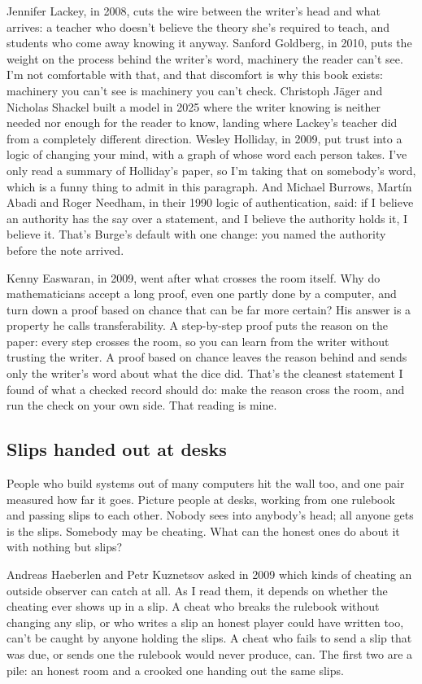 \documentclass[11pt,twoside]{article}
\theoremstyle{thielethm}
\theoremstyle{thieledef}
\theoremstyle{thieledef}
\theoremstyle{thieledef}
\theoremstyle{thielethm}
\theoremstyle{thieleobs}
\theoremstyle{thielethm}
\begin{document}
Jennifer Lackey, in 2008, cuts the wire between the writer's head and what arrives: a teacher who doesn't believe the theory she's required to teach, and students who come away knowing it anyway. Sanford Goldberg, in 2010, puts the weight on the process behind the writer's word, machinery the reader can't see. I'm not comfortable with that, and that discomfort is why this book exists: machinery you can't see is machinery you can't check. Christoph Jäger and Nicholas Shackel built a model in 2025 where the writer knowing is neither needed nor enough for the reader to know, landing where Lackey's teacher did from a completely different direction. Wesley Holliday, in 2009, put trust into a logic of changing your mind, with a graph of whose word each person takes. I've only read a summary of Holliday's paper, so I'm taking that on somebody's word, which is a funny thing to admit in this paragraph. And Michael Burrows, Martín Abadi and Roger Needham, in their 1990 logic of authentication, said: if I believe an authority has the say over a statement, and I believe the authority holds it, I believe it. That's Burge's default with one change: you named the authority before the note arrived.

Kenny Easwaran, in 2009, went after what crosses the room itself. Why do mathematicians accept a long proof, even one partly done by a computer, and turn down a proof based on chance that can be far more certain? His answer is a property he calls transferability. A step-by-step proof puts the reason on the paper: every step crosses the room, so you can learn from the writer without trusting the writer. A proof based on chance leaves the reason behind and sends only the writer's word about what the dice did. That's the cleanest statement I found of what a checked record should do: make the reason cross the room, and run the check on your own side. That reading is mine.

\subsection{Slips handed out at desks}

People who build systems out of many computers hit the wall too, and one pair measured how far it goes. Picture people at desks, working from one rulebook and passing slips to each other. Nobody sees into anybody's head; all anyone gets is the slips. Somebody may be cheating. What can the honest ones do about it with nothing but slips?

Andreas Haeberlen and Petr Kuznetsov asked in 2009 which kinds of cheating an outside observer can catch at all. As I read them, it depends on whether the cheating ever shows up in a slip. A cheat who breaks the rulebook without changing any slip, or who writes a slip an honest player could have written too, can't be caught by anyone holding the slips. A cheat who fails to send a slip that was due, or sends one the rulebook would never produce, can. The first two are a pile: an honest room and a crooked one handing out the same slips.
\end{document}
